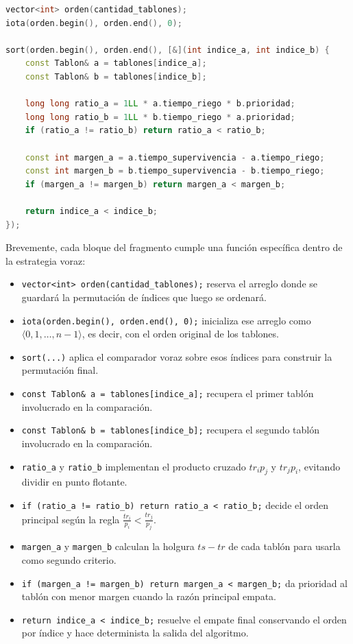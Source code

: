 \documentclass[12pt,a4paper]{article}
\begin{document}
\begin{lstlisting}[language=C++]
vector<int> orden(cantidad_tablones);
iota(orden.begin(), orden.end(), 0);

sort(orden.begin(), orden.end(), [&](int indice_a, int indice_b) {
    const Tablon& a = tablones[indice_a];
    const Tablon& b = tablones[indice_b];

    long long ratio_a = 1LL * a.tiempo_riego * b.prioridad;
    long long ratio_b = 1LL * b.tiempo_riego * a.prioridad;
    if (ratio_a != ratio_b) return ratio_a < ratio_b;

    const int margen_a = a.tiempo_supervivencia - a.tiempo_riego;
    const int margen_b = b.tiempo_supervivencia - b.tiempo_riego;
    if (margen_a != margen_b) return margen_a < margen_b;

    return indice_a < indice_b;
});
\end{lstlisting}

\noindent Brevemente, cada bloque del fragmento cumple una funci\'on espec\'ifica dentro de la estrategia voraz:
\begin{itemize}
  \item \texttt{vector<int> orden(cantidad\_tablones);} reserva el arreglo donde se guardar\'a la permutaci\'on de \'indices que luego se ordenar\'a.
  \item \texttt{iota(orden.begin(), orden.end(), 0);} inicializa ese arreglo como \(\langle 0,1,\dots,n-1\rangle\), es decir, con el orden original de los tablones.
  \item \texttt{sort(...)} aplica el comparador voraz sobre esos \'indices para construir la permutaci\'on final.
  \item \texttt{const Tablon\& a = tablones[indice\_a];} recupera el primer tabl\'on involucrado en la comparaci\'on.
  \item \texttt{const Tablon\& b = tablones[indice\_b];} recupera el segundo tabl\'on involucrado en la comparaci\'on.
  \item \texttt{ratio\_a} y \texttt{ratio\_b} implementan el producto cruzado \(tr_i p_j\) y \(tr_j p_i\), evitando dividir en punto flotante.
  \item \texttt{if (ratio\_a != ratio\_b) return ratio\_a < ratio\_b;} decide el orden principal seg\'un la regla \(\frac{tr_i}{p_i}<\frac{tr_j}{p_j}\).
  \item \texttt{margen\_a} y \texttt{margen\_b} calculan la holgura \(ts-tr\) de cada tabl\'on para usarla como segundo criterio.
  \item \texttt{if (margen\_a != margen\_b) return margen\_a < margen\_b;} da prioridad al tabl\'on con menor margen cuando la raz\'on principal empata.
  \item \texttt{return indice\_a < indice\_b;} resuelve el empate final conservando el orden por \'indice y hace determinista la salida del algoritmo.
\end{itemize}
\end{document}
